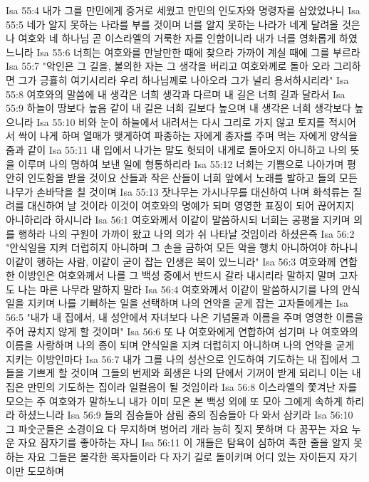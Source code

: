 Isa 55:4  내가 그를 만민에게 증거로 세웠고 만민의 인도자와 명령자를 삼았었나니
Isa 55:5  네가 알지 못하는 나라를 부를 것이며 너를 알지 못하는 나라가 네게 달려올 것은 나 여호와 네 하나님 곧 이스라엘의 거룩한 자를 인함이니라 내가 너를 영화롭게 하였느니라
Isa 55:6  너희는 여호와를 만날만한 때에 찾으라 가까이 계실 때에 그를 부르라
Isa 55:7  "악인은 그 길을, 불의한 자는 그 생각을 버리고 여호와께로 돌아 오라 그리하면 그가 긍휼히 여기시리라 우리 하나님께로 나아오라 그가 널리 용서하시리라"
Isa 55:8  여호와의 말씀에 내 생각은 너희 생각과 다르며 내 길은 너희 길과 달라서
Isa 55:9  하늘이 땅보다 높음 같이 내 길은 너희 길보다 높으며 내 생각은 너희 생각보다 높으니라
Isa 55:10  비와 눈이 하늘에서 내려서는 다시 그리로 가지 않고 토지를 적시어서 싹이 나게 하며 열매가 맺게하여 파종하는 자에게 종자를 주며 먹는 자에게 양식을 줌과 같이
Isa 55:11  내 입에서 나가는 말도 헛되이 내게로 돌아오지 아니하고 나의 뜻을 이루며 나의 명하여 보낸 일에 형통하리라
Isa 55:12  너희는 기쁨으로 나아가며 평안히 인도함을 받을 것이요 산들과 작은 산들이 너희 앞에서 노래를 발하고 들의 모든 나무가 손바닥을 칠 것이며
Isa 55:13  잣나무는 가시나무를 대신하여 나며 화석류는 질려를 대신하여 날 것이라 이것이 여호와의 명예가 되며 영영한 표징이 되어 끊어지지 아니하리라 하시니라
Isa 56:1  여호와께서 이같이 말씀하시되 너희는 공평을 지키며 의를 행하라 나의 구원이 가까이 왔고 나의 의가 쉬 나타날 것임이라 하셨은즉
Isa 56:2  "안식일을 지켜 더럽히지 아니하며 그 손을 금하여 모든 악을 행치 아니하여야 하나니 이같이 행하는 사람, 이같이 굳이 잡는 인생은 복이 있느니라"
Isa 56:3  여호와께 연합한 이방인은 여호와께서 나를 그 백성 중에서 반드시 갈라 내시리라 말하지 말며 고자도 나는 마른 나무라 말하지 말라
Isa 56:4  여호와께서 이같이 말씀하시기를 나의 안식일을 지키며 나를 기뻐하는 일을 선택하며 나의 언약을 굳게 잡는 고자들에게는
Isa 56:5  "내가 내 집에서, 내 성안에서 자녀보다 나은 기념물과 이름을 주며 영영한 이름을 주어 끊치지 않게 할 것이며"
Isa 56:6  또 나 여호와에게 연합하여 섬기며 나 여호와의 이름을 사랑하며 나의 종이 되며 안식일을 지켜 더럽히지 아니하며 나의 언약을 굳게 지키는 이방인마다
Isa 56:7  내가 그를 나의 성산으로 인도하여 기도하는 내 집에서 그들을 기쁘게 할 것이며 그들의 번제와 희생은 나의 단에서 기꺼이 받게 되리니 이는 내 집은 만민의 기도하는 집이라 일컬음이 될 것임이라
Isa 56:8  이스라엘의 쫓겨난 자를 모으는 주 여호와가 말하노니 내가 이미 모은 본 백성 외에 또 모아 그에게 속하게 하리라 하셨느니라
Isa 56:9  들의 짐승들아 삼림 중의 짐승들아 다 와서 삼키라
Isa 56:10  그 파숫군들은 소경이요 다 무지하며 벙어리 개라 능히 짖지 못하며 다 꿈꾸는 자요 누운 자요 잠자기를 좋아하는 자니
Isa 56:11  이 개들은 탐욕이 심하여 족한 줄을 알지 못하는 자요 그들은 몰각한 목자들이라 다 자기 길로 돌이키며 어디 있는 자이든지 자기 이만 도모하며
